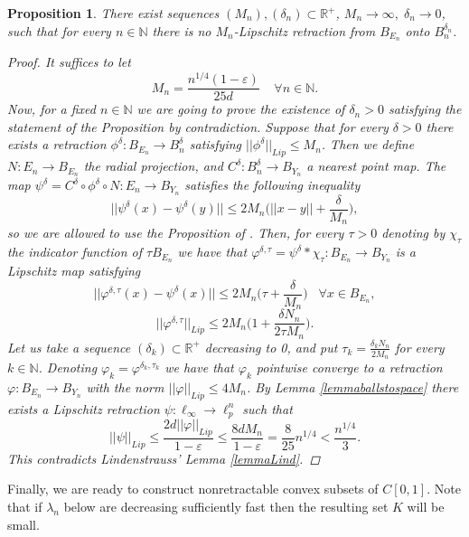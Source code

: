 \documentclass[11pt]{amsart}
\newcommand{\ep}{\varepsilon}
\newcommand{\N}{\mathbb{N}}
\newcommand{\R}{\mathbb{R}}
\newcommand{\<}{\langle}
\renewcommand{\>}{\rangle}
\newtheorem{prop}[theorem]{Proposition}
\theoremstyle{definition}
\theoremstyle{remark}
\numberwithin{equation}{section}
\def\R{{\mathbb R}}
\begin{document}
\begin{prop}\label{propbasecount}
There exist  sequences $(M_n),(\delta_n)\subset\R^+$, $M_n\to\infty,\;\delta_n\to0$, such that for every $n\in\N$ there is no $M_n$-Lipschitz retraction from $B_{E_n}$ onto $B_n^{\delta_n}$.
\begin{proof}
It suffices to let
$$M_n=\frac{n^{1/4}(1-\ep)}{25d}\;\;\;\;\forall n\in\N.$$
Now, for a fixed $n\in\N$ we are going to prove the existence of $\delta_n>0$ satisfying the statement of the Proposition by contradiction. Suppose that for every $\delta>0$ there exists a retraction $\phi^\delta:B_{E_n}\rightarrow B_n^{\delta}$ satisfying $||\phi^\delta||_{Lip}\le M_n$. Then we define $N:E_n\rightarrow B_{E_n}$ the radial projection, and $C^\delta:B_n^{\delta}\rightarrow B_{Y_n}$ a nearest point map. The map $\psi^{\delta}=C^\delta\circ \phi^\delta\circ N:E_n\rightarrow B_{Y_n}$ satisfies the following inequality
$$||\psi^{\delta}(x)-\psi^{\delta}(y)||\le2M_n\bigg(||x-y||+\frac{\delta}{M_n}\bigg),$$
so we are allowed to use the Proposition of \cite{B99}. Then, for every $\tau>0$ denoting by $\chi_\tau$ the indicator function of $\tau B_{E_n}$ we have that $\varphi^{\delta,\tau}=\psi^{\delta}*\chi_{\tau}:B_{E_n}\rightarrow B_{Y_n}$ is a Lipschitz map satisfying
$$||\varphi^{\delta,\tau}(x)-\psi^\delta(x)||\le2M_n\bigg(\tau+\frac{\delta}{M_n}\bigg)\;\;\;\forall x\in B_{E_n},$$
$$||\varphi^{\delta,\tau}||_{Lip}\le 2M_n\bigg( 1+\frac{\delta N_n}{2\tau M_n} \bigg).$$
Let us take a sequence $(\delta_k)\subset \R^+$ decreasing to 0, and put $\tau_k=\frac{\delta_kN_n}{2M_n}$ for every $k\in\N$. Denoting $\varphi_k=\varphi^{\delta_k,\tau_k}$ we have that $\varphi_k$ pointwise converge to a retraction $\varphi:B_{E_n}\rightarrow B_{Y_n}$ with the norm $||\varphi||_{Lip}\le 4M_n$. By Lemma \ref{lemmaballstospace} there exists a Lipschitz retraction $\psi:\ell_{\infty}\rightarrow \ell_p^n$ such that
$$||\psi||_{Lip}\le\frac{2d||\varphi||_{Lip}}{1-\ep}\le\frac{8dM_n}{1-\ep}=\frac{8}{25}n^{1/4}<\frac{n^{1/4}}{3}.$$
This contradicts Lindenstrauss' Lemma \ref{lemmaLind}.
\end{proof}
\end{prop}


Finally, we are ready to construct nonretractable convex subsets of $C[0,1]$. Note that if $\lambda_n$ below are decreasing sufficiently fast then the resulting
set $K$ will be small.
\end{document}
